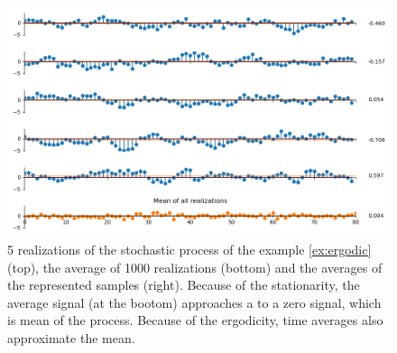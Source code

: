 %
%

\begin{figure}[htb]
\begin{center}
\includegraphics[width=12cm]{Figures/sp_ergodicity.png}
\caption{5 realizations of the stochastic process of the example \ref{ex:ergodic} (top), the average of 1000 realizations (bottom) and the averages of the represented samples (right). Because of the stationarity, the average signal (at the bootom) approaches a to a zero signal, which is mean of the process. Because of the ergodicity, time averages also approximate the mean.}
\label{fig:ergodicity}
\end{center}
\end{figure}

